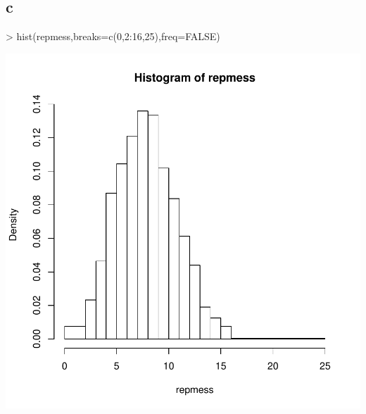 \subsection{c}
\begin{Schunk}
\begin{Sinput}
> hist(repmess,breaks=c(0,2:16,25),freq=FALSE)
\end{Sinput}
\end{Schunk}
\includegraphics{sw10_1-004}

